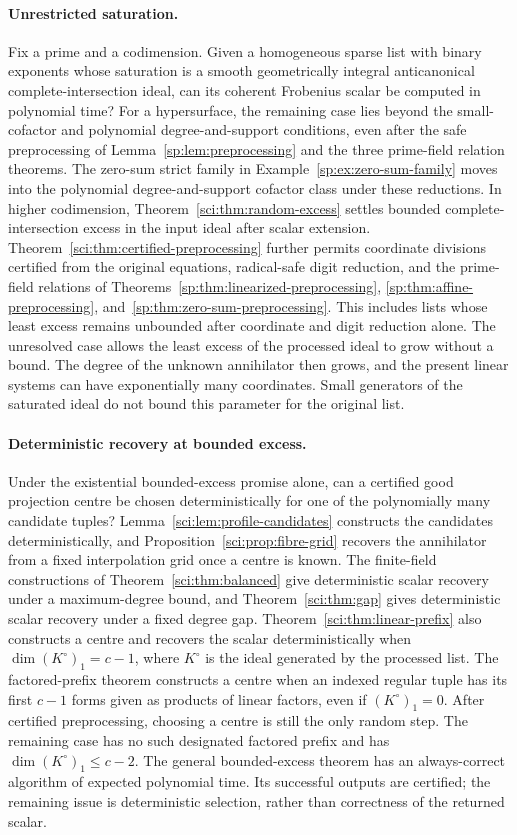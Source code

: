 \paragraph{Unrestricted saturation.}
Fix a prime and a codimension. Given a homogeneous sparse list with binary
exponents whose saturation is a smooth geometrically integral
anticanonical complete-intersection ideal, can its coherent Frobenius
scalar be computed in polynomial time? For a hypersurface, the remaining
case lies beyond the small-cofactor and polynomial degree-and-support
conditions, even after the safe preprocessing of
Lemma~\ref{sp:lem:preprocessing} and the three prime-field relation
theorems. The zero-sum strict family in
Example~\ref{sp:ex:zero-sum-family} moves into the polynomial
degree-and-support cofactor class under these reductions.
In higher codimension,
Theorem~\ref{sci:thm:random-excess} settles bounded complete-intersection
excess in the input ideal after scalar extension.
Theorem~\ref{sci:thm:certified-preprocessing} further permits coordinate
divisions certified from the original equations, radical-safe digit
reduction, and the prime-field relations of
Theorems~\ref{sp:thm:linearized-preprocessing},
\ref{sp:thm:affine-preprocessing}, and~\ref{sp:thm:zero-sum-preprocessing}.
This includes lists whose
least excess remains unbounded after coordinate and digit reduction
alone. The unresolved case allows the least excess of the
processed ideal to grow without a bound. The degree of the
unknown annihilator then grows, and the present linear systems can have
exponentially many coordinates. Small generators of the saturated ideal
do not bound this parameter for the original list.

\paragraph{Deterministic recovery at bounded excess.}
Under the existential bounded-excess promise alone, can a certified good
projection centre be chosen deterministically for one of the polynomially
many candidate tuples? Lemma~\ref{sci:lem:profile-candidates} constructs
the candidates deterministically, and Proposition~\ref{sci:prop:fibre-grid}
recovers the annihilator from a fixed interpolation grid once a centre
is known. The finite-field constructions of
Theorem~\ref{sci:thm:balanced} give deterministic scalar recovery under a maximum-degree
bound, and Theorem~\ref{sci:thm:gap} gives deterministic scalar recovery under a fixed degree gap.
Theorem~\ref{sci:thm:linear-prefix} also constructs a centre
and recovers the scalar deterministically when
\(\dim (K^\circ)_1=c-1\), where $K^\circ$ is the ideal generated
by the processed list. The factored-prefix theorem constructs a centre
when an indexed regular tuple has its first $c-1$ forms given as
products of linear factors, even if $(K^\circ)_1=0$.
After certified preprocessing, choosing a centre is still the only
random step. The remaining case has no such designated factored
prefix and has \(\dim (K^\circ)_1\leq c-2\).
The general bounded-excess theorem has an always-correct algorithm of
expected polynomial time. Its successful outputs are certified; the
remaining issue is deterministic selection, rather than correctness of
the returned scalar.

